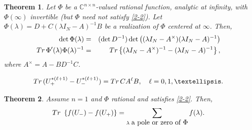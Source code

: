 \documentclass[10pt,a4paper]{amsart}
\newtheorem{thm}{Theorem}
\begin{document}
            \begin{thm}
              Let $\Phi$ be a $\mathbb C^{n\times n}$-valued rational function, analytic at infinity, with $\Phi(\infty)$ invertible (but $\Phi$ need not satisfy \eqref{2-2}).
              Let $\Phi({\lambda})=D+C({\lambda}I_N-A)^{-1}B$ be a realization of $\Phi$ centered at $\infty$. Then,
\begin{eqnarray}
  \label{eqas-1}
  \det\Phi({\lambda})&=&(\det D^{-1})\det\left(({\lambda}I_N-A^\times)({\lambda}I_N-A)^{-1}\right)\\
  {\rm Tr}\,\Phi^\prime({\lambda})\Phi({\lambda})^{-1}&=&{\rm Tr}\left\{({\lambda}I_N-A^\times)^{-1}-({\lambda}I_N-A)^{-1}\right\},
                                          \label{eqas-2}
\end{eqnarray}
where $A^\times=A-BD^{-1}C$.
            \end{thm}

\begin{equation}
\label{lala}
    {\rm Tr}\,( U_+^{*(\ell+1)}-U_-^{*(\ell+1)})={\rm Tr}\, CA^\ell B,\quad \ell=0,1,\ldots .
\end{equation}

        \begin{thm}
          \label{ththth}
          Assume $n=1$ and $\Phi$ rational and satisfies \eqref{2-2}. Then,
        \begin{equation}
          {\rm Tr}\,\,\left\{ f(U_-)-f(U_+)\right\}=\sum_{\lambda \,\,\mbox{\rm a pole or zero of $\Phi$}} f(\lambda).
        \end{equation}
      \end{thm}
\end{document}
